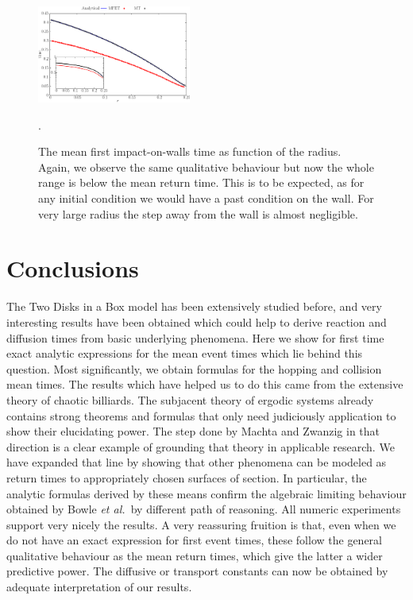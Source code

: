 \documentclass[letterpaper,10pt, jcp, aps]{revtex4-1}
\newcommand{\etal}{\emph{et al.\ }}
\begin{document}
\begin{figure}[h]
  \centering
  \includegraphics[width=0.45\textwidth]{./FigurasPerfectas/FistImpactTime01-ForPaper.pdf}
  \caption{The mean first impact-on-walls time as function of the radius. Again, 
    we observe the same qualitative behaviour but now the whole range is below
    the mean return time. This is to be expected, as for any initial condition
    we would have a past condition on the wall. For very
    large radius the step away from the wall is almost negligible.}\label{FirstImp01}.
\end{figure}


\section{Conclusions}


The Two Disks in a Box model has been extensively studied before, and
very interesting results have been obtained which could help
to derive reaction
and diffusion times from basic underlying phenomena.  Here
we show for first time exact analytic expressions for the mean event
times which lie behind this question. Most
significantly, we obtain formulas for the hopping and
collision mean times. The 
results which have helped us to do this came from the
extensive theory of chaotic billiards. The subjacent theory
of ergodic systems already contains strong theorems and formulas
that only need judiciously application to show their 
elucidating power. The step done by Machta and Zwanzig in
that direction is a clear example of grounding that
theory in applicable research. We have expanded
that line by showing that other phenomena can be modeled
as return times to appropriately chosen surfaces of section. 
In particular, the analytic formulas derived by these means
confirm the algebraic limiting behaviour obtained
by Bowle \etal by different path of reasoning. 
All numeric experiments support very nicely the results. 
A very reassuring fruition is that, even when we do not have
an exact expression for first event times, these follow
the general qualitative behaviour as the mean return times,
which give the latter a wider predictive power. The diffusive
or transport constants can now be obtained by adequate
interpretation of our results. 
\end{document}
